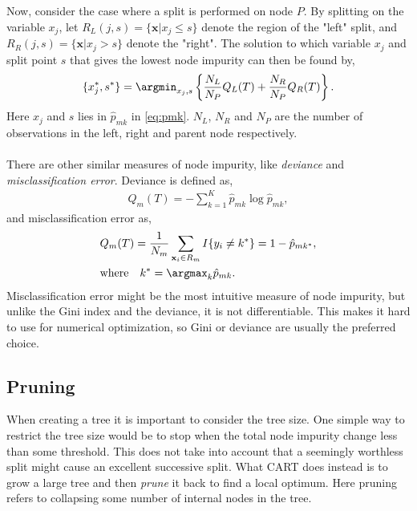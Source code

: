 Now, consider the case where a split is performed on node $P$. By splitting on the variable $x_j$, let $R_L(j,s) = \{\mathbf{x} | x_j \leq s\}$ denote the region of the "left" split,  and $R_R(j,s) = \{\mathbf{x} | x_j > s\}$ denote the "right". The solution to which variable $x_j$ and split point $s$ that gives the lowest node impurity can then be found by,
\begin{align}
  \{x_j^*, s^*\} = \argmin_{x_j,s} \left\{ \frac{N_L}{N_P} Q_L(T)
  + \frac{N_R}{N_P} Q_R(T) \right\}.
\end{align}
Here $x_j$ and $s$ lies in $\hat{p}_{mk}$ in \eqref{eq:pmk}. $N_L$, $N_R$ and $N_P$ are the number of observations in the left, right and parent node respectively.
\\
\\
There are other similar measures of node impurity, like \textit{deviance} and \textit{misclassification error}. Deviance is defined as,
\begin{align}
  Q_m(T) = -  \sum^{K}_{k=1} \hat p_{m k} \log \hat p_{m k},
\end{align}
and misclassification error as,
\begin{align}
  \label{eq:CARTmisclass} 
  &Q_m(T) = \frac{1}{N_m} \sum_{\mathbf{x}_i \in R_m} I\{y_i \neq k^*\} = 1 - \hat p_{m k^*},\\
  &\text{where} \quad k^* = \argmax_k \hat p_{m k}. \notag
\end{align}
Misclassification error might be the most intuitive measure of node impurity, but unlike the Gini index and the deviance, it is not differentiable. This makes it hard to use for numerical optimization, so Gini or deviance are usually the preferred choice. 

\subsection{Pruning}
\label{sub:Pruning}

When creating a tree it is important to consider the tree size. One simple way to restrict the tree size would be to stop when the total node impurity change less than some threshold. This does not take into account that a seemingly worthless split might cause an excellent successive split. 
What CART does instead is to grow a large tree and then \textit{prune} it back to find a local optimum. Here pruning refers to collapsing some number of internal nodes in the tree. 

